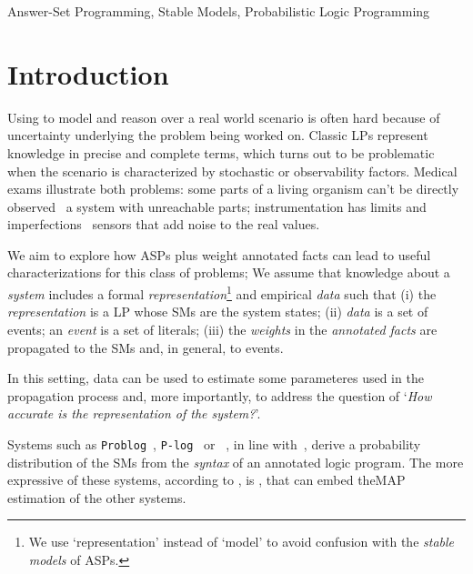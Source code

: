 \documentclass[x11names]{tlp}
\renewcommand{\cite}{\citep}
\begin{document}
\begin{keywords}
	Answer-Set Programming, Stable Models, Probabilistic Logic Programming
\end{keywords}

\section{Introduction}
\label{sec:introduction}

\noindent Using  to model and reason over a real world scenario is often hard because of uncertainty underlying the problem being worked on.
Classic \acp{LP} represent knowledge in precise and complete terms, which turns out to be problematic when the scenario is characterized by stochastic or observability factors.
%
Medical exams illustrate both problems: some parts of a living organism can't be directly observed \ie\ a system with unreachable parts; instrumentation has limits and imperfections \ie\ sensors that add noise to the real values.

We aim to explore how \acp{ASP} plus weight annotated facts can lead to useful characterizations for this class of problems; We assume that knowledge about a \emph{system} includes a formal \emph{representation}\footnote{We use `representation' instead of `model' to avoid confusion with the \emph{stable models} of \aclp{ASP}.}
and empirical \emph{data} such that (i) the \emph{representation} is a \acl{LP} whose \acp{SM} are the system states; (ii) \emph{data} is a set of events; an \emph{event} is a set of literals; (iii) the \emph{weights} in the \emph{annotated facts} are propagated to the \aclp{SM} and, in general, to events.

In this setting, data can be used to estimate some parameteres used in the propagation process and, more importantly, to address the question of `\emph{How accurate is the representation of the system?}'.

%
Systems such as \texttt{Problog}~\cite{de2007problog}, \texttt{P-log}~\cite{baral2009probabilistic} or \lpmln~\cite{lee2016weighted}, in line with~\cite{kifer1992theory}, derive a probability distribution of the \aclp{SM} from the \textit{syntax} of an annotated logic program.  The more expressive of these systems, according to \cite{lee2017lpmln}, is \lpmln, that can embed the\ac{MAP} estimation of the other systems.
\end{document}
